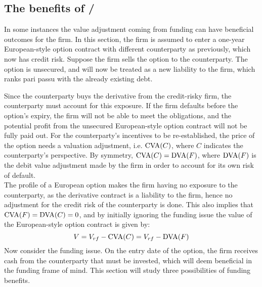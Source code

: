 \documentclass[../main.tex]{subfiles}
\begin{document}
    \subsection{The benefits of \FVA/}
        In some instances the value adjustment coming from funding can have beneficial outcomes for the firm.
        In this section, the firm is assumed to enter a one-year European-style option contract with different counterparty as previously,
        which now has credit risk.
        Suppose the firm sells the option to the counterparty. The option is unsecured, and will now be treated as a new liability to the firm, which ranks pari passu with the already existing debt.

        Since the counterparty buys the derivative from the credit-risky firm, the counterparty must account for this exposure. If the firm defaults before the option's expiry, the firm will not be able to meet the obligations, and the potential profit from the unsecured European-style option contract will not be fully paid out. For the counterparty's incentives to be re-established, the price of the option needs a valuation adjustment, i.e. $\text{\CVA/}(C)$, where $C$ indicates the counterparty's perspective. By symmetry, $\text{\CVA/}(C) = \text{\DVA/}(F)$, where $\text{\DVA/}(F)$ is the debit value adjustment made by the firm in order to account for its own risk of default.\\
        The profile of a European option makes the firm having no exposure to the counterparty, as the derivative contract is a liability to the firm, hence no adjustment for the credit risk of the counterparty is done. This also implies that $\text{\CVA/}(F) = \text{\DVA/}(C) = 0$, and by initially ignoring the funding issue the value of the European-style option contract is given by:
        \begin{equation}\label{eqn:option-value-credit-risk}
            V = V_{rf} - \text{\CVA/}(C) = V_{rf} - \text{\DVA/}(F)
        \end{equation}
        Now consider the funding issue. On the entry date of the option, the firm receives cash from the counterparty that must be invested, which will deem beneficial in the funding frame of mind. This section will study three possibilities of funding benefits.
\end{document}
